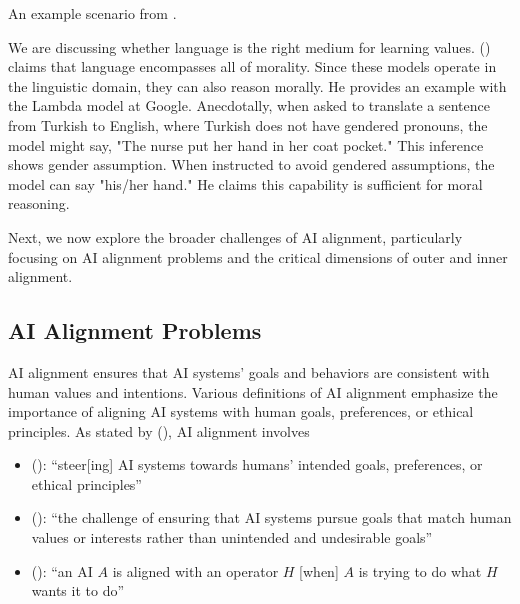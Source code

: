 \documentclass[
  letterpaper,
  DIV=11,
  numbers=noendperiod,
  oneside]{scrreprt}
\theoremstyle{remark}
\begin{document}
\label{fig:jiminy}{}

An example scenario from {}.

We are discussing whether language is the right medium for learning
values. () claims that language
encompasses all of morality. Since these models operate in the
linguistic domain, they can also reason morally. He provides an example
with the Lambda model at Google. Anecdotally, when asked to translate a
sentence from Turkish to English, where Turkish does not have gendered
pronouns, the model might say, "The nurse put her hand in her coat
pocket." This inference shows gender assumption. When instructed to
avoid gendered assumptions, the model can say "his/her hand." He claims
this capability is sufficient for moral reasoning.

Next, we now explore the broader challenges of AI alignment,
particularly focusing on AI alignment problems and the critical
dimensions of outer and inner alignment.

\subsection{AI Alignment Problems}\label{ai-alignment-problems}

AI alignment ensures that AI systems' goals and behaviors are consistent
with human values and intentions. Various definitions of AI alignment
emphasize the importance of aligning AI systems with human goals,
preferences, or ethical principles. As stated by
(), AI
alignment involves

\begin{itemize}
\item
  ():
  ``steer{[}ing{]} AI systems towards humans' intended goals,
  preferences, or ethical principles''
\item
  ():
  ``the challenge of ensuring that AI systems pursue goals that match
  human values or interests rather than unintended and undesirable
  goals''
\item
  (): ``an AI
  \(A\) is aligned with an operator \(H\) {[}when{]} \(A\) is trying to
  do what \(H\) wants it to do''
\end{itemize}
\end{document}
